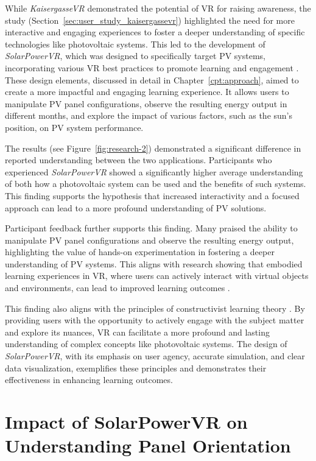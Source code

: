 \documentclass[draft, final]{vutinfth} %
\begin{document}
While \textit{KaisergasseVR} demonstrated the potential of VR for raising awareness, the study (Section~\ref{sec:user_study_kaisergassevr}) highlighted the need for more interactive and engaging experiences to foster a deeper understanding of specific technologies like photovoltaic systems. This led to the development of \textit{SolarPowerVR}, which was designed to specifically target PV systems, incorporating various VR best practices to promote learning and engagement \cite{Dalgarno2010Learning, Gee2009Deep}. These design elements, discussed in detail in Chapter~\ref{cpt:approach}, aimed to create a more impactful and engaging learning experience. It allows users to manipulate PV panel configurations, observe the resulting energy output in different months, and explore the impact of various factors, such as the sun's position, on PV system performance.

The results (see Figure~\ref{fig:research-2}) demonstrated a significant difference in reported understanding between the two applications. Participants who experienced \textit{SolarPowerVR} showed a significantly higher average understanding of both how a photovoltaic system can be used and the benefits of such systems. This finding supports the hypothesis that increased interactivity and a focused approach can lead to a more profound understanding of PV solutions.

Participant feedback further supports this finding. Many praised the ability to manipulate PV panel configurations and observe the resulting energy output, highlighting the value of hands-on experimentation in fostering a deeper understanding of PV systems. This aligns with research showing that embodied learning experiences in VR, where users can actively interact with virtual objects and environments, can lead to improved learning outcomes \cite{Sung2015Effects, Winn2002Immersion}.

This finding also aligns with the principles of constructivist learning theory \cite{Mikropoulos2011VrEducational}. By providing users with the opportunity to actively engage with the subject matter and explore its nuances, VR can facilitate a more profound and lasting understanding of complex concepts like photovoltaic systems. The design of \textit{SolarPowerVR}, with its emphasis on user agency, accurate simulation, and clear data visualization, exemplifies these principles and demonstrates their effectiveness in enhancing learning outcomes.

\section{Impact of SolarPowerVR on Understanding Panel Orientation}
\end{document}
